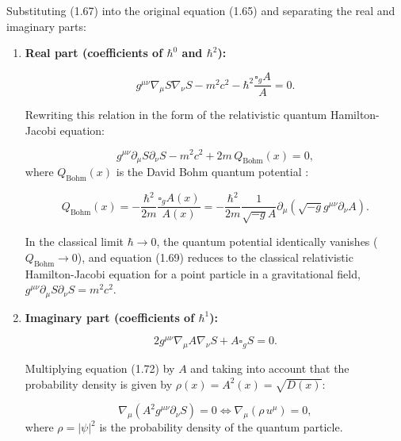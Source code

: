 \documentclass[11pt,a4paper]{article}
\theoremstyle{definition}
\begin{document}
Substituting (1.67) into the original equation (1.65) and separating the real and imaginary parts:

\begin{enumerate}
\item \textbf{Real part (coefficients of $\hbar^0$ and $\hbar^2$):}

\begin{equation}\label{eq:1.68}\tag{1.68}
g^{\mu\nu}\nabla_\mu S \nabla_\nu S - m^2 c^2 - \hbar^2 \frac{\square_g A}{A} = 0.
\end{equation}

Rewriting this relation in the form of the relativistic quantum Hamilton-Jacobi equation:

\begin{equation}\label{eq:1.69}\tag{1.69}
g^{\mu\nu}\partial_\mu S \partial_\nu S - m^2 c^2 + 2m \, Q_{\text{Bohm}}(x) = 0,
\end{equation}
where $Q_{\text{Bohm}}(x)$ is the David Bohm quantum potential \cite{ref11}:

\begin{equation}\label{eq:1.70}\tag{1.70}
Q_{\text{Bohm}}(x) = -\frac{\hbar^2}{2m} \frac{\square_g A(x)}{A(x)} = -\frac{\hbar^2}{2m} \frac{1}{\sqrt{-g} A} \partial_\mu \left( \sqrt{-g} g^{\mu\nu}\partial_\nu A \right).
\end{equation}

In the classical limit $\hbar \to 0$, the quantum potential identically vanishes ($Q_{\text{Bohm}} \to 0$), and equation (1.69) reduces to the classical relativistic Hamilton-Jacobi equation for a point particle in a gravitational field, $g^{\mu\nu}\partial_\mu S \partial_\nu S = m^2 c^2$.

\item \textbf{Imaginary part (coefficients of $\hbar^1$):}

\begin{equation}\label{eq:1.72}\tag{1.72}
2 g^{\mu\nu}\nabla_\mu A \nabla_\nu S + A \square_g S = 0.
\end{equation}

Multiplying equation (1.72) by $A$ and taking into account that the probability density is given by $\rho(x) = A^2(x) = \sqrt{D(x)}$:

\begin{equation}\label{eq:1.73}\tag{1.73}
\nabla_\mu \left( A^2 g^{\mu\nu}\partial_\nu S \right) = 0 \iff \nabla_\mu \left( \rho \, u^\mu \right) = 0,
\end{equation}
where $\rho = |\psi|^2$ is the probability density of the quantum particle.
\end{enumerate}
\end{document}
